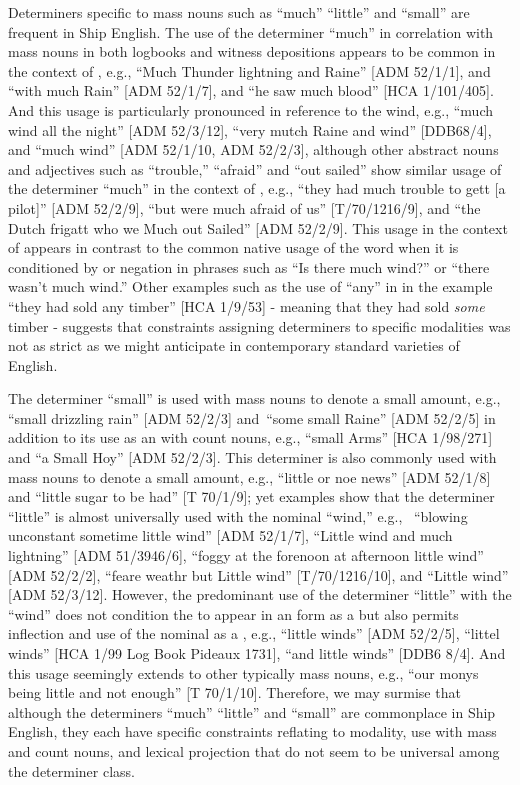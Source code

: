 Determiners specific to mass nouns such as “much” “little” and “small” are frequent in Ship English. The use of the determiner “much” in correlation with mass nouns in both logbooks and witness depositions appears to be common in the context of , e.g., “Much Thunder lightning and Raine” [ADM 52/1/1], and “with much Rain” [ADM 52/1/7], and “he saw much blood” [HCA 1/101/405]. And this usage is particularly pronounced in reference to the wind, e.g., “much wind all the night” [ADM 52/3/12], “very mutch Raine and wind” [DDB68/4], and “much wind” [ADM 52/1/10, ADM 52/2/3], although other abstract nouns and adjectives such as “trouble,” “afraid” and “out sailed” show similar usage of the determiner “much” in the context of , e.g., “they had much trouble to gett [a pilot]” [ADM 52/2/9], “but were much afraid of us” [T/70/1216/9], and “the Dutch frigatt who we Much out Sailed” [ADM 52/2/9]. This usage in the context of  appears in contrast to the common native usage of the word when it is conditioned by  or negation in phrases such as “Is there much wind?” or “there wasn’t much wind.” Other examples such as the use of “any” in  in the example “they had sold any timber” [HCA 1/9/53] - meaning that they had sold \textit{some} timber - suggests that constraints assigning determiners to specific modalities was not as strict as we might anticipate in contemporary standard varieties of English.  

The determiner “small” is used with  mass nouns to denote a small amount, e.g., “small drizzling rain” [ADM 52/2/3] and~“some small Raine” [ADM 52/2/5] in addition to its use as an  with count nouns, e.g., “small Arms” [HCA 1/98/271] and “a Small Hoy” [ADM 52/2/3]. This determiner is also commonly used with  mass nouns to denote a small amount, e.g., “little or noe news” [ADM 52/1/8] and “little sugar to be had” [T 70/1/9]; yet examples show that the determiner “little” is almost universally used with the nominal “wind,” e.g., ~“blowing unconstant sometime little wind” [ADM 52/1/7], “Little wind and much lightning” [ADM 51/3946/6], “foggy at the forenoon at afternoon little wind” [ADM 52/2/2], “feare weathr but Little wind” [T/70/1216/10], and “Little wind” [ADM 52/3/12]. However, the predominant use of the determiner “little” with the  “wind” does not condition the  to appear in an  form as a  but also permits inflection and use of the nominal as a , e.g., “little winds” [ADM 52/2/5], “littel winds” [HCA 1/99 Log Book Pideaux 1731], “and little winds” [DDB6 8/4]. And this usage seemingly extends to other typically mass nouns, e.g., “our monys being little and not enough” [T 70/1/10]. Therefore, we may surmise that although the determiners “much” “little” and “small” are commonplace in Ship English, they each have specific constraints reflating to modality, use with mass and count nouns, and lexical projection that do not seem to be universal among the determiner class.  

